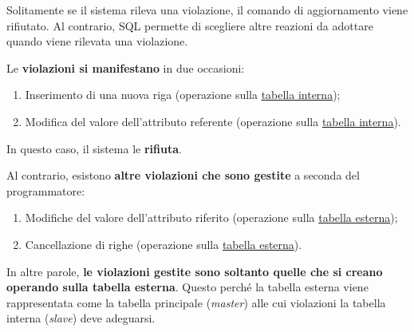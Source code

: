 \documentclass[a4paper]{article}
\begin{document}
	Solitamente se il sistema rileva una violazione, il comando di aggiornamento viene rifiutato. Al contrario, SQL permette di scegliere altre reazioni da adottare quando viene rilevata una violazione.\newline
	
	\noindent
	Le \textbf{violazioni si manifestano} in due occasioni:
	\begin{enumerate}
		\item Inserimento di una nuova riga (operazione sulla \underline{tabella interna});
		\item Modifica del valore dell'attributo referente (operazione sulla \underline{tabella interna}).
	\end{enumerate}
	In questo caso, il sistema le \textbf{rifiuta}.\newline
	
	\noindent
	Al contrario, esistono \textbf{altre violazioni che sono gestite} a seconda del programmatore:
	\begin{enumerate}
		\item Modifiche del valore dell'attributo riferito (operazione sulla \underline{tabella esterna});
		\item Cancellazione di righe (operazione sulla \underline{tabella esterna}).
	\end{enumerate}
	In altre parole, \textbf{le violazioni gestite sono soltanto quelle che si creano operando sulla tabella esterna}. Questo perché la tabella esterna viene rappresentata come la tabella principale (\emph{master}) alle cui violazioni la tabella interna (\emph{slave}) deve adeguarsi.\newline
	
\end{document}

